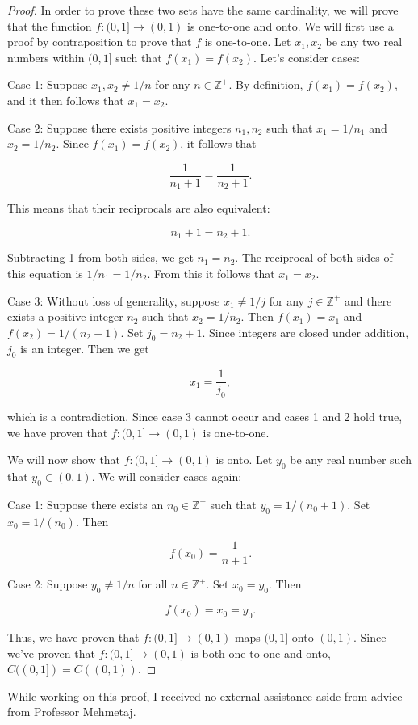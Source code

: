 \documentclass[12pt]{article}
\begin{document}
\begin{proof} In order to prove these two sets have the same cardinality, we will prove that the function $f : (0, 1] \to (0, 1) $ is one-to-one and onto. We will first use a proof by contraposition to prove that $f$ is one-to-one. Let $x_1, x_2$ be any two real numbers within $(0, 1]$ such that $f(x_1) = f(x_2)$. Let's consider cases:
    
    Case 1: Suppose $x_1, x_2 \neq 1/n$ for any $n \in \mathbb{Z}^+$. By definition, $f(x_1) = f(x_2),$ and it then follows that $x_1 = x_2$. 
    
    Case 2: Suppose there exists positive integers $n_1, n_2$ such that $x_1 = 1/n_1$ and $x_2 = 1/n_2$. Since $f(x_1) = f(x_2)$, it follows that

    $$\frac{1}{n_1 + 1} = \frac{1}{n_2 + 1}.$$

    This means that their reciprocals are also equivalent:

    $$n_1 + 1 = n_2 + 1.$$

    Subtracting 1 from both sides, we get $n_1 = n_2$. The reciprocal of both sides of this equation is $1/n_1 = 1/n_2$. From this it follows that $x_1 = x_2$.

    Case 3: Without loss of generality, suppose $x_1 \neq 1/j$ for any $j \in \mathbb{Z}^+$ and there exists a positive integer $n_2$ such that $x_2 = 1/n_2$. Then $f(x_1) = x_1$ and $f(x_2) = 1/(n_2 + 1)$. Set $j_0 = n_2 + 1$. Since integers are closed under addition, $j_0$ is an integer. Then we get

    $$x_1 = \frac{1}{j_0},$$

    which is a contradiction. Since case 3 cannot occur and cases 1 and 2 hold true, we have proven that $f: (0, 1] \to (0, 1)$ is one-to-one.

    \noindent
    We will now show that $f: (0, 1] \to (0, 1) $ is onto. Let $y_0$ be any real number such that $y_0 \in (0, 1)$. We will consider cases again:

    Case 1: Suppose there exists an $n_0 \in \mathbb{Z}^+$ such that $y_0 = 1/(n_0 + 1)$. Set $x_0 = 1/(n_0)$. Then 
    
    $$f(x_0) = \frac{1}{n+1}.$$

    Case 2: Suppose $y_0 \neq 1/n$ for all $n \in \mathbb{Z}^+$. Set $x_0 = y_0$. Then

    $$f(x_0) = x_0 = y_0.$$

    Thus, we have proven that $f: (0, 1] \to (0, 1) $ maps $(0, 1]$ onto $(0, 1)$. Since we've proven that $f: (0, 1] \to (0, 1) $ is both one-to-one and onto, $C((0, 1]) = C((0, 1))$.

\end{proof}


\noindent While working on this proof, I received no external assistance aside from advice from Professor Mehmetaj.
\end{document}
